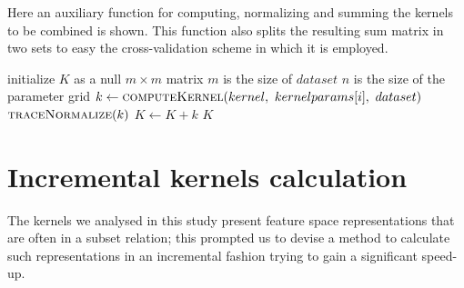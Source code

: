 \begin{algorithm}
    \caption{
        Here an auxiliary function for computing, normalizing and summing the
        kernels to be combined is shown.
        This function also splits the resulting sum matrix in two sets to
        easy the cross-validation scheme in which it is employed.
    }
    \label{alg:compute_sum}
    \begin{algorithmic}[1]
            \State initialize $K$ as a null $m\times m$ matrix
            \Comment $m$ is the size of $dataset$
            \Comment $n$ is the size of the parameter grid
            \State $k \gets \Call{computeKernel}{kernel,~kernelparams[i],~dataset}$
                    \State $\Call{traceNormalize}{k}$
                    \State $K \gets K+k$
                \EndFor
            \EndFor
            \State \Return $K$
        \EndFunction
    \end{algorithmic}
\end{algorithm}


\section{Incremental kernels calculation} 
\label{sec:inc}
The kernels we analysed in this study present feature space representations
that are often in a subset relation; this prompted us to devise a method to
calculate such representations in an incremental fashion trying to gain a
significant speed-up.

